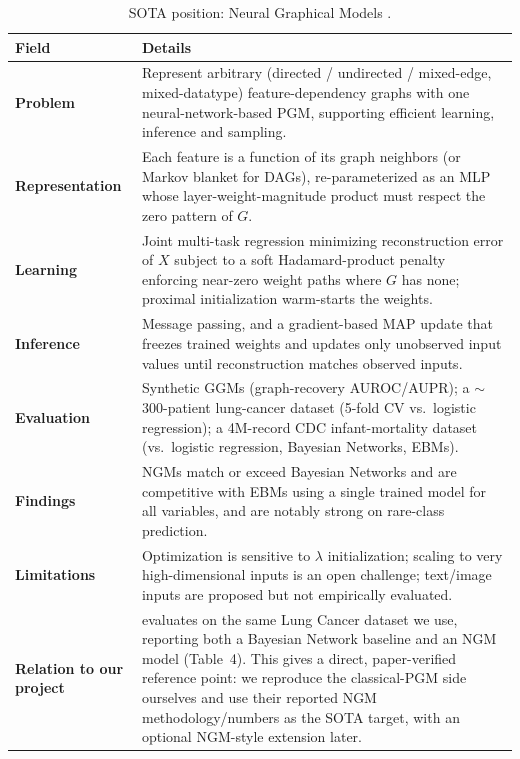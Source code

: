 \documentclass[10pt,twocolumn,letterpaper]{article}
\newcommand{\tablesize}{\scriptsize}
\begin{document}
\begin{table}[!htbp]
\centering
\caption{SOTA position: Neural Graphical Models \cite{ngm}.}
\label{tab:m1sota}
\tablesize
\renewcommand{\arraystretch}{1.15}
\begin{tabular}{@{}>{\bfseries}p{}p{}@{}}
\toprule
Field & Details \\
\midrule
Problem & Represent arbitrary (directed / undirected / mixed-edge, mixed-datatype) feature-dependency graphs with one neural-network-based PGM, supporting efficient learning, inference and sampling. \\
Representation & Each feature is a function of its graph neighbors (or Markov blanket for DAGs), re-parameterized as an MLP whose layer-weight-magnitude product must respect the zero pattern of $G$. \\
Learning & Joint multi-task regression minimizing reconstruction error of $X$ subject to a soft Hadamard-product penalty enforcing near-zero weight paths where $G$ has none; proximal initialization warm-starts the weights. \\
Inference & Message passing, and a gradient-based MAP update that freezes trained weights and updates only unobserved input values until reconstruction matches observed inputs. \\
Evaluation & Synthetic GGMs (graph-recovery AUROC/AUPR); a $\sim$300-patient lung-cancer dataset (5-fold CV vs.\ logistic regression); a 4M-record CDC infant-mortality dataset (vs.\ logistic regression, Bayesian Networks, EBMs). \\
Findings & NGMs match or exceed Bayesian Networks and are competitive with EBMs using a single trained model for all variables, and are notably strong on rare-class prediction. \\
Limitations & Optimization is sensitive to $\lambda$ initialization; scaling to very high-dimensional inputs is an open challenge; text/image inputs are proposed but not empirically evaluated. \\
Relation to our project & \cite{ngm} evaluates on the same Lung Cancer dataset we use, reporting both a Bayesian Network baseline and an NGM model (Table~4). This gives a direct, paper-verified reference point: we reproduce the classical-PGM side ourselves and use their reported NGM methodology/numbers as the SOTA target, with an optional NGM-style extension later. \\
\bottomrule
\end{tabular}
\end{table}
\end{document}

